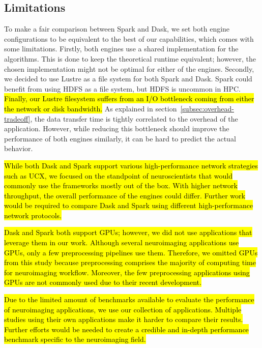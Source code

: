 \documentclass[AMA,STIX1COL]{WileyNJD-v2}
\newcommand{\HL}[1]{\hl{#1}}
\begin{document}
\subsection{Limitations}
To make a fair comparison between Spark and Dask, we set both engine configurations
to be equivalent to the best of our capabilities, which comes with some limitations.
Firstly, both engines use a shared implementation for the algorithms.
This is done to keep the theoretical runtime equivalent; however, the chosen
implementation might not be optimal for either of the engines.
Secondly, we decided to use Lustre as a file system for both Spark and Dask.
Spark could benefit from using HDFS as a file system, but HDFS is uncommon in HPC.
\HL{Finally, our Lustre filesystem suffers from an I/O bottleneck coming from 
either the network or disk bandwidth.}
As explained in section~{\ref{subsec:overhead-tradeoff}}, the data transfer 
time is tightly correlated to the overhead of the application.
However, while reducing this bottleneck should improve the performance of 
both engines similarly, it can be hard to predict the actual behavior.

\HL{
	While both Dask and Spark support various high-performance network strategies
	such as UCX, we focused on the standpoint of neuroscientists that would 
	commonly use the frameworks mostly out of the box.
	With higher network throughput, the overall performance of the engines could differ.
	Further work would be required to compare Dask and Spark using different high-performance
	network protocols.
}
			
\HL{
	Dask and Spark both support GPUs; however, we did not use applications that
	leverage them in our work.
	Although several neuroimaging applications use GPUs, only a few preprocessing pipelines use them.
	Therefore, we omitted GPUs from this study because preprocessing comprises the majority of computing time for neuroimaging
	workflow.
	Moreover, the few preprocessing applications using GPUs are not commonly used
	due to their recent development.
}

\HL{
	Due to the limited amount of benchmarks available to evaluate the performance
    of neuroimaging applications, we use our collection of applications.
    Multiple studies using their own applications make it harder to compare
    their results.
    Further efforts would be needed to create a credible and in-depth performance
    benchmark specific to the neuroimaging field.
}
											
\end{document}
